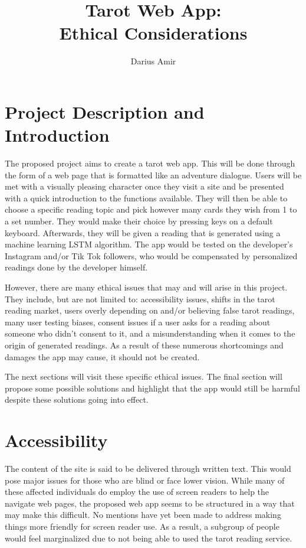 \documentclass[10pt,twocolumn]{article}
\title{Tarot Web App: \\Ethical Considerations}
\author{Darius Amir}
\affiliation{Occidental College}
\begin{document}
\maketitle

\section{Project Description and Introduction}
    The proposed project aims to create a tarot web app. This will be done through the form of a web page that is formatted like an adventure dialogue. Users will be met with a visually pleasing character once they visit a site and be presented with a quick introduction to the functions available. They will then be able to choose a specific reading topic and pick however many cards they wish from 1 to a set number. They would make their choice by pressing keys on a default keyboard. Afterwards, they will be given a reading that is generated using a machine learning LSTM algorithm. The app would be tested on the developer's Instagram and/or Tik Tok followers, who would be compensated by personalized readings done by the developer himself. 
    
    However, there are many ethical issues that may and will arise in this project. They include, but are not limited to: accessibility issues, shifts in the tarot reading market, users overly depending on and/or believing false tarot readings, many user testing biases, consent issues if a user asks for a reading about someone who didn’t consent to it, and a misunderstanding when it comes to the origin of generated readings. As a result of these numerous shortcomings and damages the app may cause, it should not be created. 
    
    The next sections will visit these specific ethical issues. The final section will propose some possible solutions and highlight that the app would still be harmful despite these solutions going into effect.


\section{Accessibility}
    The content of the site is said to be delivered through written text. This would pose major issues for those who are blind or face lower vision. While many of these affected individuals do employ the use of screen readers\cite{scrR} to help the navigate web pages, the proposed web app seems to be structured in a way that may make this difficult. No mentions have yet been made to address making things more friendly for screen reader use. As a result, a subgroup of people would feel marginalized due to not being able to used the tarot reading service. 
    
\end{document}
